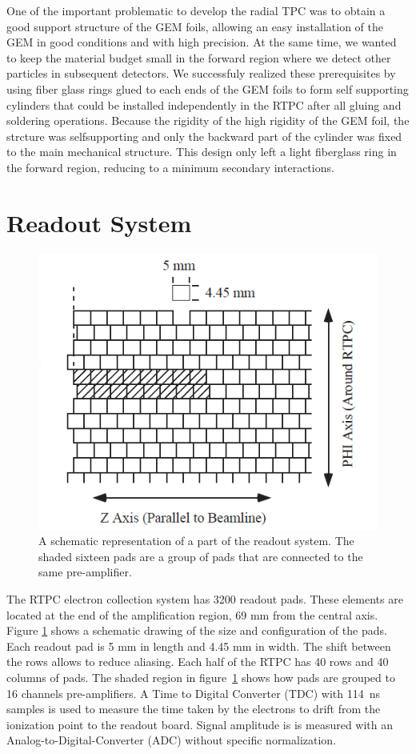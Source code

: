 \documentclass[twocolumn,showpacs,superscriptaddress,groupedaddress]{revtex4}
\begin{document}
One of the important problematic to develop the radial TPC was to obtain a 
good support structure of the GEM foils, allowing an easy installation of the 
GEM in good conditions and with high precision. At the same time, we wanted to 
keep the material budget small in the forward region where we detect other 
particles in subsequent detectors. We successfuly realized these prerequisites 
by using fiber glass rings glued to each ends of the GEM foils to form self 
supporting cylinders that could be installed independently in the RTPC after 
all gluing and soldering operations.  Because the rigidity of the high 
rigidity of the GEM foil, the strcture was selfsupporting and only the 
backward part of the cylinder was fixed to the main mechanical structure. This 
design only left a light fiberglass ring in the forward region, reducing to a 
minimum secondary interactions.

\section{Readout System} \label{sec_readout}

\begin{figure}[tb]
   \centering
   \includegraphics[scale=0.55]{fig/PADs.png}
   \caption[]{A schematic representation of a part of the readout system.  The 
   shaded sixteen pads are a group of pads that are connected to the same 
pre-amplifier.} \label{fig:PADs}
\end{figure}

The RTPC electron collection system has 3200 readout pads. These elements are
located at the end of the amplification region, 69 mm from the central axis.
Figure \ref{fig:PADs} shows a schematic drawing of the size and 
configuration of the pads. Each readout pad is 5 mm in length and 4.45 mm in 
width.  The shift between the rows allows to reduce aliasing. Each half of the 
RTPC has 40 rows and 40 columns of pads. The shaded region in figure~\ref{fig:PADs}
shows how pads are grouped to 16 channels pre-amplifiers. A Time to Digital
Converter (TDC) with 114~ns samples is used to measure the time taken by
the electrons to drift from the ionization point to the readout board.  Signal
amplitude is is measured with an Analog-to-Digital-Converter (ADC) without
specific normalization. 
\end{document}
